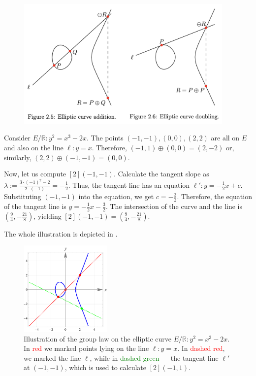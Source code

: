 \documentclass[../lecture-notes-148x210.tex]{subfiles}
\begin{document}
\begin{figure}[H]
    \centering
    \includegraphics[width=0.95\textwidth]{images/lecture_3/group_law.png}
    \label{fig:group_law}
\end{figure}

\begin{example}
    Consider $E/\mathbb{R}: y^2=x^3-2x$. The points $(-1,-1),(0,0),(2,2)$ are all on $E$ and also on the line $\ell: y=x$. Therefore, $(-1,1) \oplus (0,0) = (2,-2)$ or, similarly, $(2,2) \oplus (-1,-1) = (0,0)$.

    Now, let us compute $[2](-1,-1)$. Calculate the tangent slope as $\lambda := \frac{3\cdot(-1)^2 - 2}{2\cdot(-1)} = -\frac{1}{2}$. Thus, the tangent line has an equation $\ell': y = -\frac{1}{2}x+c$. Substituting $(-1,-1)$ into the equation, we get $c=-\frac{3}{2}$. Therefore, the equation of the tangent line is $y=-\frac{1}{2}x-\frac{3}{2}$. The intersection of the curve and the line is $\left(\frac{9}{4},-\frac{21}{8}\right)$, yielding $[2](-1,-1) = \left(\frac{9}{4},-\frac{21}{8}\right)$.

    The whole illustration is depicted in .

    \begin{figure}[H]
        \centering
        \includegraphics[width=0.4\textwidth]{images/lecture_3/ec_illustration_2.pdf}
        \caption{Illustration of the group law on the elliptic curve $E/\mathbb{R}: y^2=x^3-2x$. In \textcolor{red}{red} we marked points lying on the line $\ell: y=x$. In \textcolor{red}{dashed red}, we marked the line $\ell$, while in \textcolor{green}{dashed green} --- the tangent line $\ell'$ at $(-1,-1)$, which is used to calculate $[2](-1,1)$.}
        \label{fig:ec_2}
    \end{figure}
\end{example}
\end{document}
